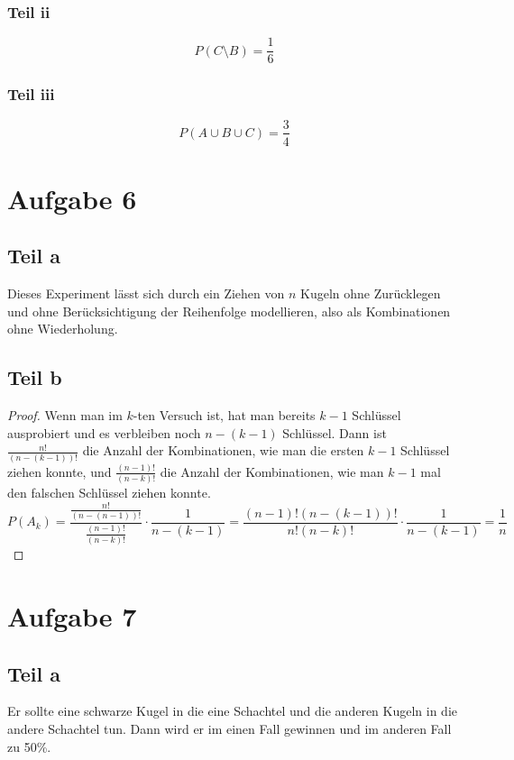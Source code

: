 \documentclass[10pt,a4paper]{article}
\begin{document}
\subsubsection{Teil ii}
\begin{equation}
  P(C \setminus B) = \frac{1}{6}
\end{equation}

\subsubsection{Teil iii}
\begin{equation}
  P(A \cup B \cup C) = \frac{3}{4}
\end{equation}

\section{Aufgabe 6}

\subsection{Teil a}
Dieses Experiment lässt sich durch ein Ziehen von $n$ Kugeln ohne Zurücklegen und ohne Berücksichtigung der Reihenfolge modellieren, also als Kombinationen ohne Wiederholung.

\subsection{Teil b}
\begin{proof}
  Wenn man im $k$-ten Versuch ist, hat man bereits $k - 1$ Schlüssel ausprobiert und es verbleiben noch $n - (k - 1)$ Schlüssel.
  Dann ist $\frac{n!}{(n - (k - 1))!}$ die Anzahl der Kombinationen, wie man die ersten $k - 1$ Schlüssel ziehen konnte, und $\frac{(n - 1)!}{(n - k)!}$ die Anzahl der Kombinationen, wie man $k - 1$ mal den falschen Schlüssel ziehen konnte.
  \begin{equation}
    P(A_{k}) = \frac{\frac{n!}{(n - (n - 1))!}}{\frac{(n - 1)!}{(n - k)!}} \cdot \frac{1}{n - (k - 1)} = \frac{(n - 1)!(n - (k - 1))!}{n!(n - k)!} \cdot \frac{1}{n - (k - 1)} = \frac{1}{n}
  \end{equation}
\end{proof}

\section{Aufgabe 7}

\subsection{Teil a}
Er sollte eine schwarze Kugel in die eine Schachtel und die anderen Kugeln in die andere Schachtel tun.
Dann wird er im einen Fall gewinnen und im anderen Fall zu 50\%.
\end{document}
